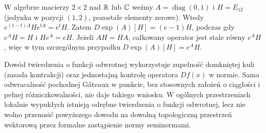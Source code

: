 \begin{przyklad}
\label{ex:noncommuting-exp15}
W algebrze macierzy $2\times2$ nad $\mathbb R$ lub $\mathbb C$ weźmy $A=\operatorname{diag}(0,1)$ i $H=E_{12}$ (jedynka w pozycji $(1,2)$, pozostałe elementy zerowe). Wtedy $e^{(1-t)A}He^{tA}=e^t H$. Zatem
$D\exp(A)[H]=(e-1)H$, podczas gdy $e^AH=H$ i
$He^A=eH$. Jeżeli $AH=HA$, całkowany operator
jest stale równy $e^AH$, więc w tym szczególnym
przypadku $D\exp(A)[H]=e^AH$.
\end{przyklad}

\begin{uwaga}
\label{rem:limits-inverse15}
Dowód twierdzenia o funkcji odwrotnej wykorzystuje zupełność domkniętej kuli (zasada kontrakcji) oraz jednostajną kontrolę operatora $Df(x)$ w normie. Sama odwracalność pochodnej Gâteaux w punkcie, bez stosownych założeń o ciągłości i pełnej różniczkowalności, nie daje takiego wniosku. W ogólnych przestrzeniach lokalnie wypukłych istnieją odrębne twierdzenia o funkcji odwrotnej, lecz nie wolno przenosić powyższego dowodu na dowolną topologiczną przestrzeń wektorową przez formalne zastąpienie normy seminormami.
\end{uwaga}
